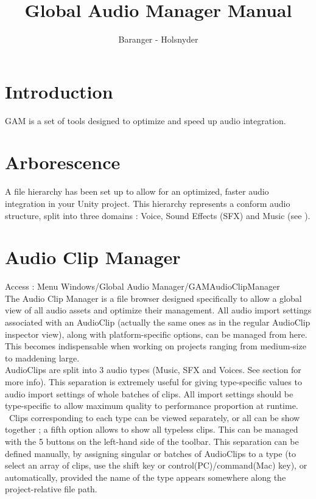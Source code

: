 \documentclass[a4paper,10pt]{article}
\begin{document}
\title{Global Audio Manager Manual}
\author{Baranger - Holsnyder}
\maketitle

\clearpage


\tableofcontents %

\clearpage



\section*{Introduction}

GAM is a set of tools designed to optimize and speed up audio integration.

\section{Arborescence}

A file hierarchy has been set up to allow for an optimized, faster audio integration in your Unity project. This hierarchy represents a conform audio structure, split into three domains : Voice, Sound Effects (SFX) and Music (see ).


\section{Audio Clip Manager}

Access : Menu Windows/Global Audio Manager/GAMAudioClipManager
\\

The Audio Clip Manager is a file browser designed specifically to allow a global view of all audio assets and optimize their management. All audio import settings associated with an AudioClip (actually the same ones as in the regular AudioClip inspector view), along with platform-specific options, can be managed from here. This becomes indispensable when working on projects ranging from medium-size to maddening large. \\

AudioClips are split into 3 audio types (Music, SFX and Voices. See  section for more info). This separation is extremely useful for giving type-specific values to audio import settings of whole batches of clips. All import settings should be type-specific to allow maximum quality to performance proportion at runtime. \
Clips corresponding to each type can be viewed separately, or all can be show together ; a fifth option allows to show all typeless clips. This can be managed with the 5 buttons on the left-hand side of the toolbar. This separation can be defined manually, by assigning singular or batches of AudioClips to a type (to select an array of clips, use the shift key or control(PC)/command(Mac) key), or automatically, provided the name of the type appears somewhere along the project-relative file path.\\
\end{document}

